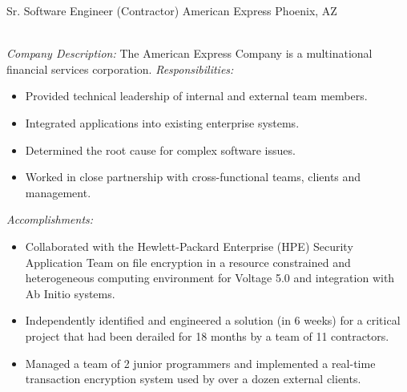\begin{samepage}
	{Sr. Software Engineer (Contractor)}
	{American Express}
	{Phoenix, AZ}{}%
	{
		\emph{\\Company Description:}
		The American Express Company is a multinational financial services
		corporation.
		\newline{}
		\newline{}
		\emph{Responsibilities:}
		\begin{itemize}
			\item Provided technical leadership of internal and external team members.
			\item Integrated applications into existing enterprise systems.
			\item Determined the root cause for complex software issues.
			\item Worked in close partnership with cross-functional teams, clients and management.\\
		\end{itemize}
		\emph{Accomplishments:}
		\begin{itemize}
			\item
			      Collaborated with the Hewlett-Packard Enterprise (HPE) Security
			      Application Team on file encryption in a resource constrained and
			      heterogeneous computing environment for Voltage 5.0 and integration
			      with {Ab Initio} systems.
			\item
			      Independently identified and engineered a solution (in 6 weeks) for a
			      critical project that had been derailed for 18 months by a team of 11
			      contractors.
			\item Managed a team of 2 junior programmers and implemented a real-time transaction encryption system used by over a dozen external clients.\\
		\end{itemize}
	}
\end{samepage}
